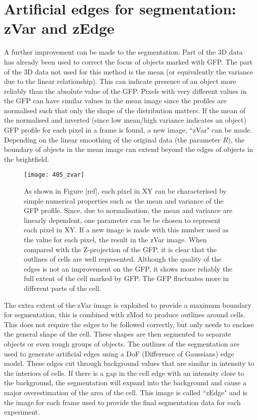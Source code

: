 \section{Artificial edges for segmentation: zVar and zEdge}

A further improvement can be made to the segmentation. Part of the 3D data has already been used to correct the focus of objects marked with GFP. The part of the 3D data not used for this method is the mean (or equivalently the variance due to the linear relationship). This can indicate presence of an object more reliably than the absolute value of the GFP. Pixels with very different values in the GFP can have similar values in the mean image since the profiles are normalised such that only the shape of the distribution matters. If the mean of the normalised and inverted (since low mean/high variance indicates an object) GFP profile for each pixel in a frame is found, a new image, ``zVar" can be made. Depending on the linear smoothing of the original data (the parameter $R$), the boundary of objects in the mean image can extend beyond the edges of objects in the brightfield.

\begin{figure}[h!]
 \centering
 \texttt{[image: 405\_zvar]}
 \caption[zVar example]{
 	As shown in Figure [ref], each pixel in XY can be characterised by simple numerical properties such as the mean and variance of the GFP profile. Since, due to normalisation, the mean and variance are linearly dependent, one parameter can be be chosen to represent each pixel in XY. If a new image is made with this number used as the value for each pixel, the result in the zVar image. When compared with the Z-projection of the GFP, it is clear that the outlines of cells are well represented. Although the quality of the edges is not an improvement on the GFP, it shows more reliably the full extent of the cell marked by GFP. The GFP fluctuates more in different parts of the cell.
 }
 \label{fig:zvar}
\end{figure}

The extra extent of the zVar image is exploited to provide a maximum boundary for segmentation, this is combined with zMod to produce outlines around cells. This does not require the edges to be followed correctly, but only needs to enclose the general shape of the cell. These shapes are then segmented to separate objects or even rough groups of objects. The outlines of the segmentation are used to generate artificial edges using a DoF (Difference of Gaussians) edge model. These edges cut through background values that are similar in intensity to the interiors of cells. If there is a gap in the cell edge with an intensity close to the background, the segmentation will expand into the background and cause a major overestimation of the area of the cell. This image is called ``zEdge" and is the image for each frame used to provide the final segmentation data for each experiment.

